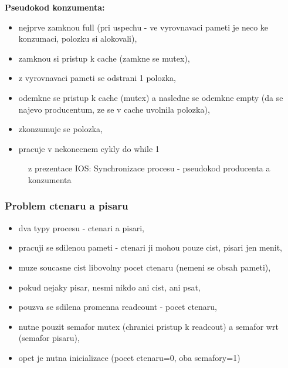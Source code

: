 \documentclass[a4paper, 11pt]{article}
\begin{document}
\textbf{Pseudokod konzumenta:}
\begin{itemize}
    \item nejprve zamknou full (pri uspechu - ve vyrovnavaci pameti je neco ke konzumaci, polozku si alokovali),
    \item zamknou si pristup k cache (zamkne se mutex),
    \item z vyrovnavaci pameti se odstrani 1 polozka,
    \item odemkne se pristup k cache (mutex) a nasledne se odemkne empty (da se najevo producentum, ze se v cache uvolnila polozka),
    \item zkonzumuje se polozka,
    \item pracuje v nekonecnem cykly do while 1 \\
\end{itemize}

\begin{figure} [h]
    \centering
    \caption{z prezentace IOS: Synchronizace procesu - pseudokod producenta a konzumenta}
\end{figure}

\newpage

\subsubsection{Problem ctenaru a pisaru}
\begin{itemize}
    \item dva typy procesu - ctenari a pisari,
    \item pracuji se sdilenou pameti - ctenari ji mohou pouze cist, pisari jen menit,
    \item muze soucasne cist libovolny pocet ctenaru (nemeni se obsah pameti),
    \item pokud nejaky pisar, nesmi nikdo ani cist, ani psat,
    \item pouzva se sdilena promenna readcount - pocet ctenaru,
    \item nutne pouzit semafor mutex (chranici pristup k readcout) a semafor wrt (semafor pisaru),
    \item opet je nutna inicializace (pocet ctenaru=0, oba semafory=1) \\
\end{itemize}
\end{document}
